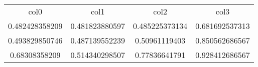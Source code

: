 \begin{table}
\begin{tabular}{cccc}
col0 & col1 & col2 & col3 \\
0.482428358209 & 0.481823880597 & 0.485225373134 & 0.681692537313 \\
0.493829850746 & 0.487139552239 & 0.50961119403 & 0.850562686567 \\
0.68308358209 & 0.514340298507 & 0.77836641791 & 0.928412686567 \\
\end{tabular}
\end{table}
